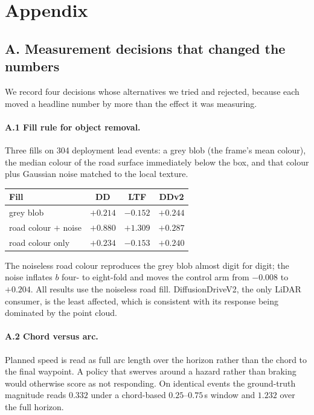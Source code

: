 \section*{Appendix}

\subsection*{A. Measurement decisions that changed the numbers}

We record four decisions whose alternatives we tried and rejected, because each moved a
headline number by more than the effect it was measuring.

\paragraph{A.1 Fill rule for object removal.}
Three fills on 304 deployment lead events: a grey blob (the frame's mean colour), the median
colour of the road surface immediately below the box, and that colour plus Gaussian noise
matched to the local texture.

\begin{center}\small
\begin{tabular}{lccc}
\toprule
Fill & DD & LTF & DDv2 \\
\midrule
grey blob            & $+0.214$ & $-0.152$ & $+0.244$ \\
road colour $+$ noise & $+0.880$ & $+1.309$ & $+0.287$ \\
road colour only     & $+0.234$ & $-0.153$ & $+0.240$ \\
\bottomrule
\end{tabular}
\end{center}

The noiseless road colour reproduces the grey blob almost digit for digit; the noise inflates
$b$ four- to eight-fold and moves the control arm from $-0.008$ to $+0.204$. All results use
the noiseless road fill. DiffusionDriveV2, the only LiDAR consumer, is the least affected,
which is consistent with its response being dominated by the point cloud.

\paragraph{A.2 Chord versus arc.}
Planned speed is read as full arc length over the horizon rather than the chord to the final
waypoint. A policy that swerves around a hazard rather than braking would otherwise score as
not responding. On identical events the ground-truth magnitude reads $0.332$ under a
chord-based $0.25$--$0.75$\,s window and $1.232$ over the full horizon.

